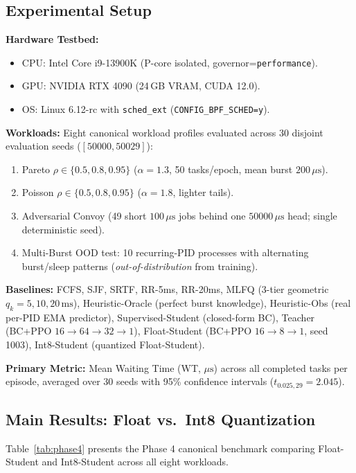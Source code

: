 \subsection{Experimental Setup}
\label{subsec:setup}

\textbf{Hardware Testbed:}
\begin{itemize}
  \item CPU: Intel Core i9-13900K (P-core isolated, governor=\texttt{performance}).
  \item GPU: NVIDIA RTX 4090 (24\,GB VRAM, CUDA 12.0).
  \item OS: Linux 6.12-rc with \texttt{sched\_ext} (\texttt{CONFIG\_BPF\_SCHED=y}).
\end{itemize}

\textbf{Workloads:} Eight canonical workload profiles evaluated across 30
disjoint evaluation seeds ($[50000, 50029]$):
\begin{enumerate}
  \item Pareto $\rho \in \{0.5, 0.8, 0.95\}$ ($\alpha = 1.3$, 50 tasks/epoch,
    mean burst $200\,\mu\text{s}$).
  \item Poisson $\rho \in \{0.5, 0.8, 0.95\}$ ($\alpha = 1.8$, lighter tails).
  \item Adversarial Convoy (49 short $100\,\mu\text{s}$ jobs behind one
    $50000\,\mu\text{s}$ head; single deterministic seed).
  \item Multi-Burst OOD test: 10 recurring-PID processes with
    alternating burst/sleep patterns (\emph{out-of-distribution} from training).
\end{enumerate}

\textbf{Baselines:} FCFS, SJF, SRTF, RR-5ms, RR-20ms, MLFQ (3-tier geometric
$q_k = 5, 10, 20\,\text{ms}$), Heuristic-Oracle (perfect burst knowledge),
Heuristic-Obs (real per-PID EMA predictor), Supervised-Student (closed-form
BC), Teacher (BC+PPO $16\to 64\to 32\to 1$), Float-Student
(BC+PPO $16\to 8\to 1$, seed 1003), Int8-Student (quantized Float-Student).

\textbf{Primary Metric:} Mean Waiting Time (WT, $\mu\text{s}$) across all
completed tasks per episode, averaged over 30 seeds with 95\% confidence
intervals ($t_{0.025,29} = 2.045$).

\subsection{Main Results: Float vs.\ Int8 Quantization}
\label{subsec:main_results}

Table~\ref{tab:phase4} presents the Phase 4 canonical benchmark comparing
Float-Student and Int8-Student across all eight workloads.

